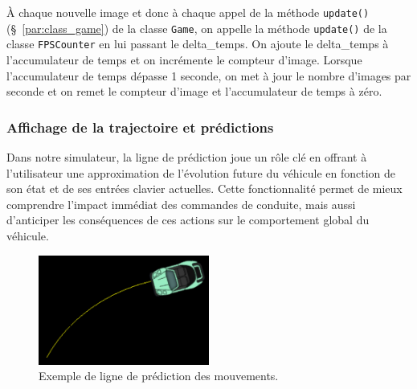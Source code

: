 À chaque nouvelle image et donc à chaque appel de la méthode \texttt{update()} (\S~\ref{par:class_game}) de la classe \texttt{Game}, on appelle la méthode \texttt{update()} de la classe \texttt{FPSCounter} en lui passant le \gls{delta_temps}.
On ajoute le \gls{delta_temps} à l'accumulateur de temps et on incrémente le compteur d'image.
Lorsque l'accumulateur de temps dépasse 1 seconde, on met à jour le nombre d'images par seconde et on remet le compteur d'image et l'accumulateur de temps à zéro.

\subsubsection{Affichage de la trajectoire et prédictions}\label{subsubsec:affichage-de-la-trajectoire-et-predictions}
Dans notre simulateur, la ligne de prédiction joue un rôle clé en offrant à l'utilisateur une approximation de l'évolution future du véhicule en fonction de son état et de ses entrées clavier actuelles.
Cette fonctionnalité permet de mieux comprendre l'impact immédiat des commandes de conduite, mais aussi d'anticiper les conséquences de ces actions sur le comportement global du véhicule.

\begin{figure}[H]
    \centering
    \includegraphics[width=0.5\textwidth]{resources/example_prediction_line_1}
    \caption{Exemple de ligne de prédiction des mouvements.}
    \label{fig:prediction_line}
\end{figure}

